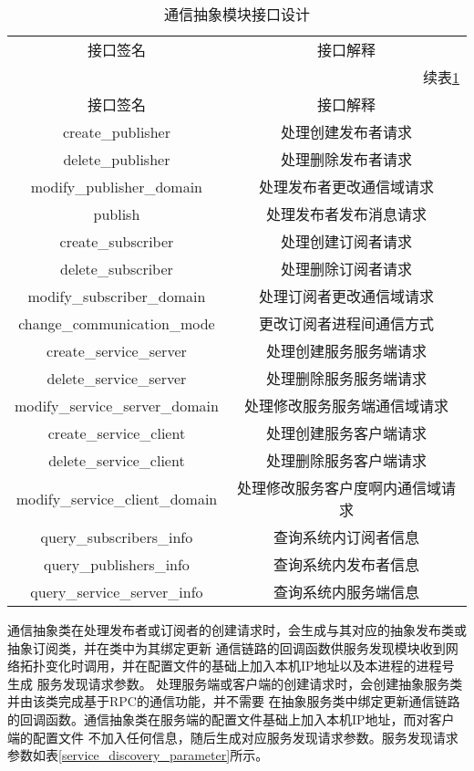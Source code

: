 \begin{longtable}{cc}
  \caption{通信抽象模块接口设计}\label{communication_abstract_interface}\renewcommand\arraystretch{1.11}\\
  \toprule
  接口签名 & 接口解释 \\
  \midrule
  \endfirsthead
  
  \multicolumn{2}{r}{续表\ref{communication_abstract_interface}}\\
  \toprule
  接口签名 & 接口解释 \\
  \hline
  \endhead
  
  \endfoot
  
  \bottomrule
  \endlastfoot
  create\_publisher & 处理创建发布者请求\\
  delete\_publisher & 处理删除发布者请求\\
  modify\_publisher\_domain & 处理发布者更改通信域请求\\
  publish & 处理发布者发布消息请求 \\
  create\_subscriber & 处理创建订阅者请求\\
  delete\_subscriber & 处理删除订阅者请求\\
  modify\_subscriber\_domain & 处理订阅者更改通信域请求\\ 
  change\_communication\_mode & 更改订阅者进程间通信方式 \\
  create\_service\_server & 处理创建服务服务端请求\\
  delete\_service\_server & 处理删除服务服务端请求\\
  modify\_service\_server\_domain & 处理修改服务服务端通信域请求\\
  create\_service\_client & 处理创建服务客户端请求\\
  delete\_service\_client & 处理删除服务客户端请求\\
  modify\_service\_client\_domain & 处理修改服务客户度啊内通信域请求\\
  query\_subscribers\_info & 查询系统内订阅者信息\\
  query\_publishers\_info & 查询系统内发布者信息\\
  query\_service\_server\_info & 查询系统内服务端信息\\
  \end{longtable}  

通信抽象类在处理发布者或订阅者的创建请求时，会生成与其对应的抽象发布类或抽象订阅类，并在类中为其绑定更新
通信链路的回调函数供服务发现模块收到网络拓扑变化时调用，并在配置文件的基础上加入本机IP地址以及本进程的进程号生成
服务发现请求参数。
处理服务端或客户端的创建请求时，会创建抽象服务类并由该类完成基于RPC的通信功能，并不需要
在抽象服务类中绑定更新通信链路的回调函数。通信抽象类在服务端的配置文件基础上加入本机IP地址，而对客户端的配置文件
不加入任何信息，随后生成对应服务发现请求参数。服务发现请求参数如表\ref{service_discovery_parameter}所示。



